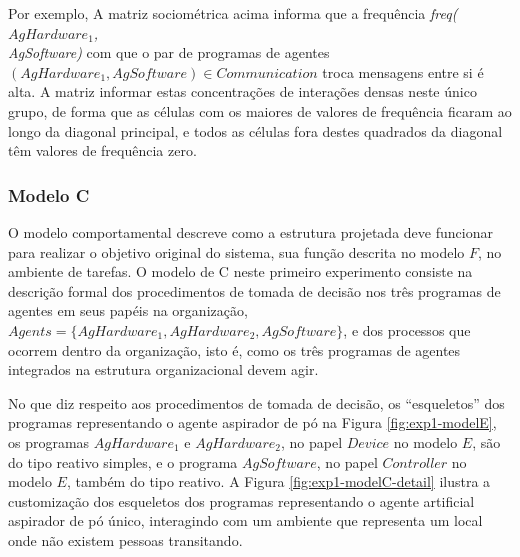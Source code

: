     Por exemplo, A matriz sociométrica acima informa que a frequência \emph{freq($AgHardware_1$, \\AgSoftware)} com que o par de programas de agentes $(AgHardware_1, AgSoftware) \in Communication$ troca mensagens entre si é alta. A matriz informar estas concentrações de interações densas neste único grupo, de forma que as células com os maiores de valores de frequência ficaram ao longo da diagonal principal, e todos as células fora destes quadrados da diagonal têm valores de frequência zero.

\subsubsection{Modelo C}

O modelo comportamental descreve como a estrutura projetada deve funcionar para realizar o objetivo original do sistema, sua função descrita no modelo $F$, no ambiente de tarefas. O modelo de C neste primeiro experimento consiste na descrição formal dos procedimentos de tomada de decisão nos três programas de agentes em seus papéis na organização, $Agents = \{AgHardware_1, AgHardware_2, AgSoftware\}$, e dos processos que ocorrem dentro da organização, isto é, como os três programas de agentes integrados na estrutura organizacional devem agir.

No que diz respeito aos procedimentos de tomada de decisão, os “esqueletos” dos programas representando o agente aspirador de pó na Figura \ref{fig:exp1-modelE}, os programas $AgHardware_1$ e $AgHardware_2$, no papel $Device$ no modelo $E$, são do tipo reativo simples, e o programa $AgSoftware$, no papel $Controller$ no modelo $E$, também do tipo reativo. A Figura \ref{fig:exp1-modelC-detail} ilustra a customização dos esqueletos dos programas representando o agente artificial aspirador de pó único, interagindo com um ambiente que representa um local onde não existem pessoas transitando.

\begin{figure}[h!]
    \centering
\end{figure}

